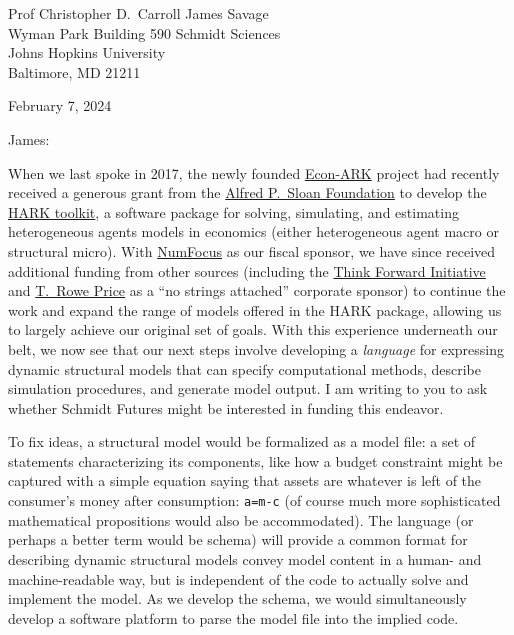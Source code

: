 \documentclass[11pt,pdftex,letterpaper]{article}
\begin{document}
	
\begin{singlespace}
	Prof Christopher D.\ Carroll \hfill James Savage\\
	Wyman Park Building 590 \hfill Schmidt Sciences\\
	Johns Hopkins University \hfill %
        \\
	Baltimore, MD 21211 \hfill %
	
	\vspace{0.2cm}
	
	February 7, 2024
	
\end{singlespace}

\vspace{0.3cm}

James:

When we last spoke in 2017, the newly founded \href{http://www.econ-ark.org}{Econ-ARK} project had recently received a generous grant from the \href{https://sloan.org}{Alfred P.\ Sloan Foundation} to develop the \href{https://github.com/econ-ark/HARK}{HARK toolkit}, a software package for solving, simulating, and estimating heterogeneous agents models in economics (either heterogeneous agent macro or structural micro). With \href{https://numfocus.org/}{NumFocus} as our fiscal sponsor, we have since received additional funding from other sources (including the \href{https://inomics.com/institution/think-forward-initiative-1258337}{Think Forward Initiative} and \href{https://www.troweprice.com/en}{T.\ Rowe Price} as a ``no strings attached'' corporate sponsor) to continue the work and expand the range of models offered in the HARK package, allowing us to largely achieve our original set of goals. With this experience underneath our belt, we now see that our next steps involve developing a \textit{language} for expressing dynamic structural models that can specify computational  methods, describe simulation procedures, and generate model output. I am writing to you to ask whether Schmidt Futures might be interested in funding this endeavor.

To fix ideas, a structural model would be formalized as a model file: a set of statements characterizing its components, like how a budget constraint might be captured with a simple equation saying that assets are whatever is left of the consumer's money after consumption: \texttt{a=m-c} (of course much more sophisticated mathematical propositions would also be accommodated).  The language (or perhaps a better term would be schema) will provide a common format for describing dynamic structural models convey model content in a human- and machine-readable way, but is independent of the code to actually solve and implement the model. As we develop the schema, we would simultaneously develop a software platform to parse the model file into the implied code. %
\end{document}
